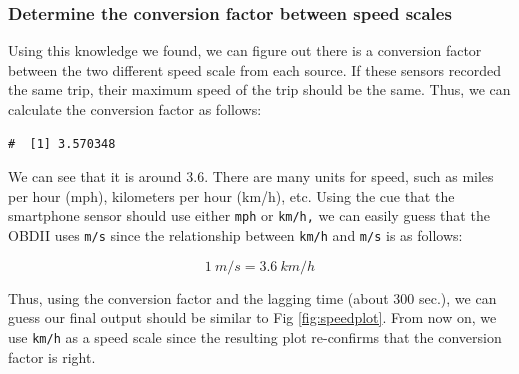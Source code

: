 \documentclass[letterpaper,9pt,twocolumn,twoside,]{pinp}
\begin{document}
\hypertarget{determine-the-conversion-factor-between-speed-scales}{%
\subsubsection{Determine the conversion factor between speed
scales}\label{determine-the-conversion-factor-between-speed-scales}}

Using this knowledge we found, we can figure out there is a conversion
factor between the two different speed scale from each source. If these
sensors recorded the same trip, their maximum speed of the trip should
be the same. Thus, we can calculate the conversion factor as follows:

\begin{Shaded}
\begin{Highlighting}[]
\OperatorTok{$}\OperatorTok{/}\StringTok{ }
\StringTok{  }\OperatorTok{$}
\end{Highlighting}
\end{Shaded}

\begin{ShadedResult}
\begin{verbatim}
#  [1] 3.570348
\end{verbatim}
\end{ShadedResult}

We can see that it is around 3.6. There are many units for speed, such
as miles per hour (mph), kilometers per hour (km/h), etc. Using the cue
that the smartphone sensor should use either \texttt{mph} or
\texttt{km/h,} we can easily guess that the OBDII uses \texttt{m/s}
since the relationship between \texttt{km/h} and \texttt{m/s} is as
follows:

\[
1 \ m/s = 3.6 \ km/h
\]

Thus, using the conversion factor and the lagging time (about 300 sec.),
we can guess our final output should be similar to Fig
\ref{fig:speedplot}. From now on, we use \texttt{km/h} as a speed scale
since the resulting plot re-confirms that the conversion factor is
right.
\end{document}
